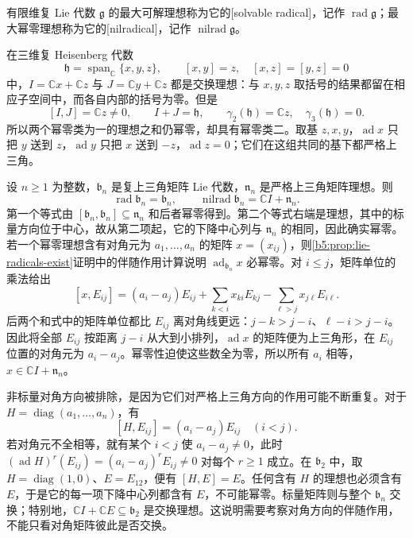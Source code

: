 \begin{definition}\label{b5:def:lie-radicals}
	有限维复 Lie 代数 \(\mathfrak g\) 的最大可解理想称为它的[solvable radical]，记作 \(\operatorname{rad}\mathfrak g\)；最大幂零理想称为它的[nilradical]，记作 \(\operatorname{nilrad}\mathfrak g\)。
\end{definition}

\begin{example}\label{b5:exm:nilpotent-ideal-sum}
	在三维复 Heisenberg 代数
	\[
		\mathfrak h=\operatorname{span}_{\mathbb C}\{x,y,z\},\qquad [x,y]=z,\quad[x,z]=[y,z]=0
	\]
	中，\(I=\mathbb Cx+\mathbb Cz\) 与 \(J=\mathbb Cy+\mathbb Cz\) 都是交换理想：与 \(x,y,z\) 取括号的结果都留在相应子空间中，而各自内部的括号为零。但是
	\[
		[I,J]=\mathbb Cz\ne0,\qquad I+J=\mathfrak h,\qquad \gamma_2(\mathfrak h)=\mathbb Cz,\quad\gamma_3(\mathfrak h)=0.
	\]
	所以两个幂零类为一的理想之和仍幂零，却具有幂零类二。取基 \(z,x,y\)，\(\operatorname{ad}x\) 只把 \(y\) 送到 \(z\)，\(\operatorname{ad}y\) 只把 \(x\) 送到 \(-z\)，\(\operatorname{ad}z=0\)；它们在这组共同的基下都严格上三角。
\end{example}

\begin{example}\label{b5:exm:radical-upper-triangular}
	设 \(n\ge1\) 为整数，\(\mathfrak b_n\) 是复上三角矩阵 Lie 代数，\(\mathfrak n_n\) 是严格上三角矩阵理想。则
	\[
		\operatorname{rad}\mathfrak b_n=\mathfrak b_n,\qquad \operatorname{nilrad}\mathfrak b_n=\mathbb CI+\mathfrak n_n.
	\]
	第一个等式由 \([\mathfrak b_n,\mathfrak b_n]\subseteq\mathfrak n_n\) 和后者幂零得到。第二个等式右端是理想，其中的标量方向位于中心，故从第二项起，它的下降中心列与 \(\mathfrak n_n\) 的相同，因此确实幂零。若一个幂零理想含有对角元为 \(a_1,\ldots,a_n\) 的矩阵 \(x=(x_{ij})\)，则\cref{b5:prop:lie-radicals-exist}证明中的伴随作用计算说明 \(\operatorname{ad}_{\mathfrak b_n}x\) 必幂零。对 \(i\leq j\)，矩阵单位的乘法给出
	\[
		[x,E_{ij}]=(a_i-a_j)E_{ij} +\sum_{k<i}x_{ki}E_{kj}-\sum_{\ell>j}x_{j\ell}E_{i\ell}.
	\]
	后两个和式中的矩阵单位都比 \(E_{ij}\) 离对角线更远：\(j-k>j-i\)、\(\ell-i>j-i\)。因此将全部 \(E_{ij}\) 按距离 \(j-i\) 从大到小排列，\(\operatorname{ad}x\) 的矩阵便为上三角形，在 \(E_{ij}\) 位置的对角元为 \(a_i-a_j\)。幂零性迫使这些数全为零，所以所有 \(a_i\) 相等，\(x\in\mathbb CI+\mathfrak n_n\)。

	非标量对角方向被排除，是因为它们对严格上三角方向的作用可能不断重复。对于 \(H=\operatorname{diag}(a_1,\ldots,a_n)\)，有
	\[
		[H,E_{ij}]=(a_i-a_j)E_{ij}\quad(i<j).
	\]
	若对角元不全相等，就有某个 \(i<j\) 使 \(a_i-a_j\ne0\)，此时 \((\operatorname{ad}H)^r(E_{ij})=(a_i-a_j)^rE_{ij}\ne0\) 对每个 \(r\ge1\) 成立。在 \(\mathfrak b_2\) 中，取 \(H=\operatorname{diag}(1,0)\)、\(E=E_{12}\)，便有 \([H,E]=E\)。任何含有 \(H\) 的理想也必须含有 \(E\)，于是它的每一项下降中心列都含有 \(E\)，不可能幂零。标量矩阵则与整个 \(\mathfrak b_n\) 交换；特别地，\(\mathbb CI+\mathbb CE\subseteq\mathfrak b_2\) 是交换理想。这说明需要考察对角方向的伴随作用，不能只看对角矩阵彼此是否交换。
\end{example}

